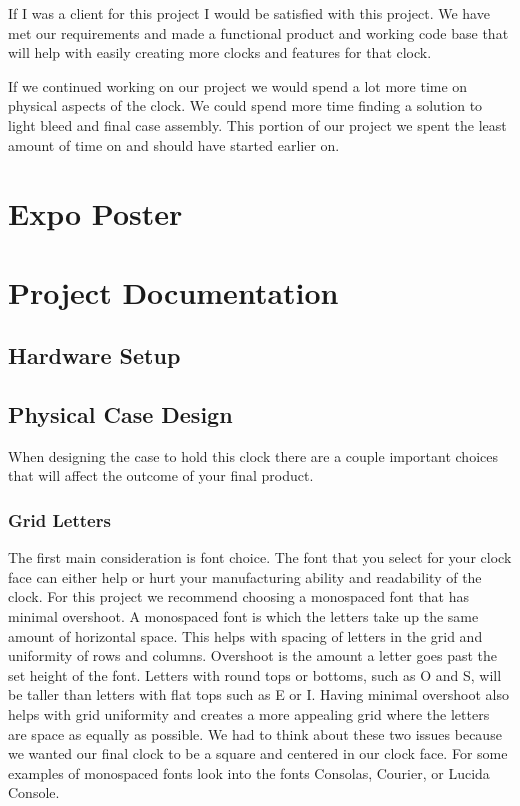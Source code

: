 \documentclass[onecolumn, draftclsnofoot,10pt, compsoc]{IEEEtran}
\begin{document}
If I was a client for this project I would be satisfied with this project. We have met our requirements and made a functional product and working code base that will help with easily creating more clocks and features for that clock.

If we continued working on our project we would spend a lot more time on physical aspects of the clock. We could spend more time finding a solution to light bleed and final case assembly. This portion of our project we spent the least amount of time on and should have started earlier on.

\section{Expo Poster}
\newpage

\section{Project Documentation}
\subsection{Hardware Setup}
\subsection{Physical Case Design}
When designing the case to hold this clock there are a couple important choices that will affect the outcome of your final product.

\subsubsection{Grid Letters}
The first main consideration is font choice.
The font that you select for your clock face can either help or hurt your manufacturing ability and readability of the clock.
For this project we recommend choosing a monospaced font that has minimal overshoot.
A monospaced font is which the letters take up the same amount of horizontal space.
This helps with spacing of letters in the grid and uniformity of rows and columns.
Overshoot is the amount a letter goes past the set height of the font.
Letters with round tops or bottoms, such as O and S, will be taller than letters with flat tops such as E or I.
Having minimal overshoot also helps with grid uniformity and creates a more appealing grid where the letters are space as equally as possible.
We had to think about these two issues because we wanted our final clock to be a square and centered in our clock face.
For some examples of monospaced fonts look into the fonts Consolas, Courier, or Lucida Console.
\end{document}
